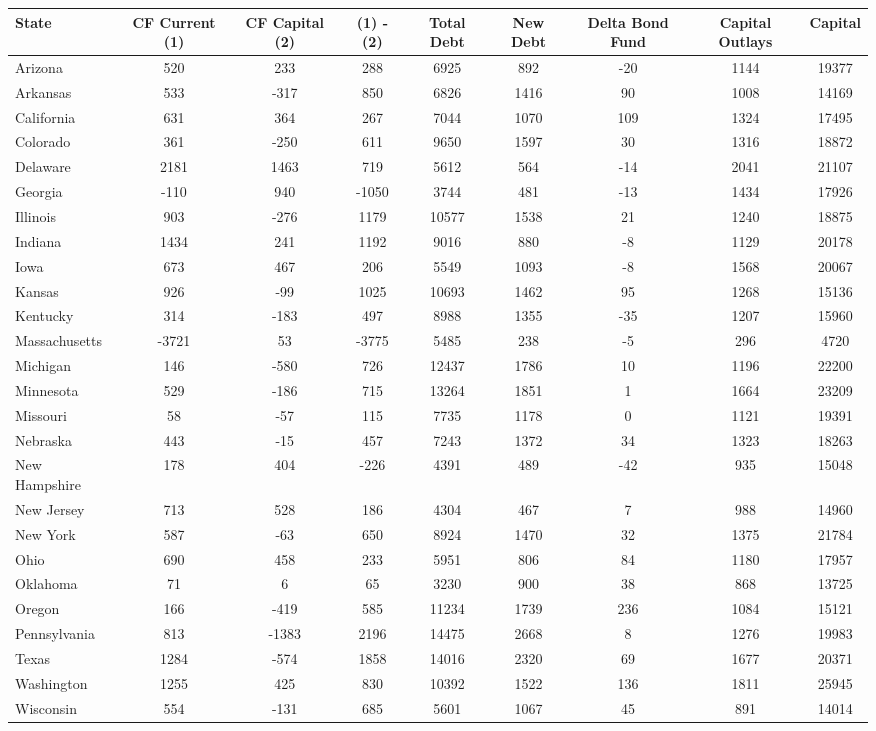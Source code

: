 \begin{tabularx}{\linewidth}{@{}lCCCCCCCC@{}}

\toprule
{State}&{CF Current (1)}&{CF Capital (2)}&{(1) - (2)}&{Total Debt}&{New Debt}&{Delta Bond Fund}&{Capital Outlays}&{Capital} \tabularnewline
\midrule \addlinespace[\belowrulesep]
Arizona&520&233&288&6925&892&-20&1144&19377 \tabularnewline
Arkansas&533&-317&850&6826&1416&90&1008&14169 \tabularnewline
California&631&364&267&7044&1070&109&1324&17495 \tabularnewline
Colorado&361&-250&611&9650&1597&30&1316&18872 \tabularnewline
Delaware&2181&1463&719&5612&564&-14&2041&21107 \tabularnewline
Georgia&-110&940&-1050&3744&481&-13&1434&17926 \tabularnewline
Illinois&903&-276&1179&10577&1538&21&1240&18875 \tabularnewline
Indiana&1434&241&1192&9016&880&-8&1129&20178 \tabularnewline
Iowa&673&467&206&5549&1093&-8&1568&20067 \tabularnewline
Kansas&926&-99&1025&10693&1462&95&1268&15136 \tabularnewline
Kentucky&314&-183&497&8988&1355&-35&1207&15960 \tabularnewline
Massachusetts&-3721&53&-3775&5485&238&-5&296&4720 \tabularnewline
Michigan&146&-580&726&12437&1786&10&1196&22200 \tabularnewline
Minnesota&529&-186&715&13264&1851&1&1664&23209 \tabularnewline
Missouri&58&-57&115&7735&1178&0&1121&19391 \tabularnewline
Nebraska&443&-15&457&7243&1372&34&1323&18263 \tabularnewline
New Hampshire&178&404&-226&4391&489&-42&935&15048 \tabularnewline
New Jersey&713&528&186&4304&467&7&988&14960 \tabularnewline
New York&587&-63&650&8924&1470&32&1375&21784 \tabularnewline
Ohio&690&458&233&5951&806&84&1180&17957 \tabularnewline
Oklahoma&71&6&65&3230&900&38&868&13725 \tabularnewline
Oregon&166&-419&585&11234&1739&236&1084&15121 \tabularnewline
Pennsylvania&813&-1383&2196&14475&2668&8&1276&19983 \tabularnewline
Texas&1284&-574&1858&14016&2320&69&1677&20371 \tabularnewline
Washington&1255&425&830&10392&1522&136&1811&25945 \tabularnewline
Wisconsin&554&-131&685&5601&1067&45&891&14014 \tabularnewline
\bottomrule 

\end{tabularx}